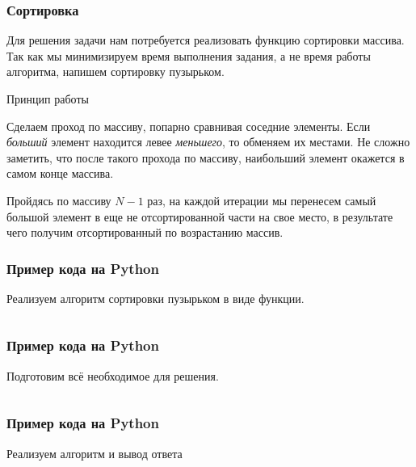\documentclass{beamer}
\begin{document}
\begin{frame}

    \frametitle{Сортировка}

    Для решения задачи нам потребуется реализовать функцию сортировки массива. Так как мы минимизируем время выполнения задания, а не время работы алгоритма, напишем \alert{сортировку пузырьком}.

    \pause

    \begin{block}{Принцип работы}

        Сделаем проход по массиву, попарно сравнивая соседние элементы. Если \emph{больший} элемент находится левее \emph{меньшего}, то обменяем их местами. Не сложно заметить, что после такого прохода по массиву, наибольший элемент окажется в самом конце массива.

        Пройдясь по массиву $N - 1$ раз, на каждой итерации мы перенесем самый большой элемент в еще не отсортированной части на свое место, в результате чего получим отсортированный по возрастанию массив.

    \end{block}


\end{frame}

\begin{frame}[fragile]

    \frametitle{Пример кода на Python}

    Реализуем алгоритм сортировки пузырьком в виде функции.

    \inputminted[frame=single, fontsize=\small]{python}{src/sort.py}

\end{frame}

\begin{frame}[fragile]

    \frametitle{Пример кода на Python}

    Подготовим всё необходимое для решения.

    \inputminted[frame=single, fontsize=\small]{python}{src/declaration.py}

\end{frame}

\begin{frame}[fragile]

    \frametitle{Пример кода на Python}

    Реализуем алгоритм и вывод ответа

    \inputminted[frame=single, fontsize=\footnotesize]{python}{src/solution.py}

\end{frame}
\end{document}
